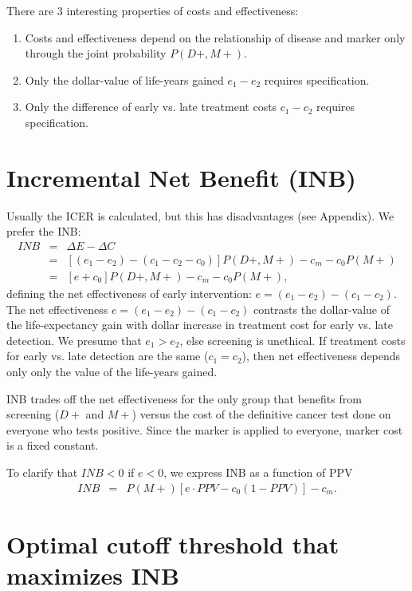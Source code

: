 \documentclass[11pt]{article}
\begin{document}
There are 3 interesting properties of costs and effectiveness:
\begin{enumerate}
\item Costs and effectiveness depend on the relationship of disease and marker only through the joint probability $P(D+,M+)$. 
\item Only the dollar-value of life-years gained $e_1-e_2$ requires specification.
\item Only the difference of early vs. late treatment costs $c_1-c_2$ requires specification.  
\end{enumerate}


\section{Incremental Net Benefit (INB)}
Usually the ICER is calculated, but this has disadvantages (see Appendix).  We prefer the INB:
\begin{eqnarray} 
  INB &=& \Delta E - \Delta C\\ \nonumber
      &=& [(e_1-e_2)-(c_1-c_2-c_0)]P(D+,M+) - c_m - c_0P(M+)\\ \nonumber
      &=& [e+c_0]P(D+,M+) - c_m - c_0P(M+), \label{eq:INB}
\end{eqnarray}
defining the net effectiveness of early intervention: $e = (e_1-e_2)-(c_1-c_2)$. The net effectiveness $e=(e_1-e_2)-(c_1-c_2)$ contrasts the dollar-value of the life-expectancy gain with dollar increase in treatment cost for early vs. late detection.  We presume that $e_1>e_2$, else screening is unethical.  If treatment costs for early vs. late detection are the same ($c_1=c_2$), then net effectiveness depends only only the value of the life-years gained.

INB trades off the net effectiveness for the only group that benefits from screening ($D+$ and $M+$) versus the cost of the definitive cancer test done on everyone who tests positive.  Since the marker is applied to everyone, marker cost is a fixed constant.

To clarify that $INB<0$ if $e<0$, we express INB as a function of PPV 
\begin{eqnarray*} 
  INB &=& P(M+)[e\cdot PPV - c_0(1-PPV)] - c_m.
\end{eqnarray*}


\section{Optimal cutoff threshold that maximizes INB}
\end{document}
